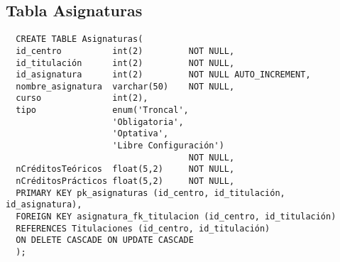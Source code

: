\subsection{Tabla Asignaturas}

\begin{verbatim}
  CREATE TABLE Asignaturas(
  id_centro          int(2)         NOT NULL,
  id_titulación      int(2)         NOT NULL,
  id_asignatura      int(2)         NOT NULL AUTO_INCREMENT,
  nombre_asignatura  varchar(50)    NOT NULL,
  curso              int(2),
  tipo               enum('Troncal',
                     'Obligatoria',
                     'Optativa',
                     'Libre Configuración')
                                    NOT NULL,
  nCréditosTeóricos  float(5,2)     NOT NULL,
  nCréditosPrácticos float(5,2)     NOT NULL,
  PRIMARY KEY pk_asignaturas (id_centro, id_titulación, id_asignatura),
  FOREIGN KEY asignatura_fk_titulacion (id_centro, id_titulación)
  REFERENCES Titulaciones (id_centro, id_titulación)
  ON DELETE CASCADE ON UPDATE CASCADE
  );
\end{verbatim}